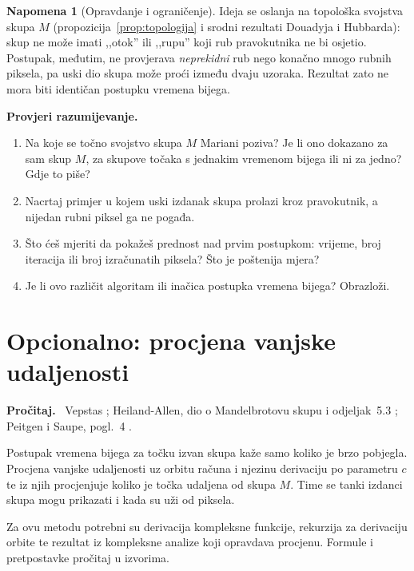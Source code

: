 \documentclass[11pt,a4paper]{article}
\theoremstyle{definition}
\newtheorem*{napomena}{Napomena}
\theoremstyle{plain}
\newenvironment{citaj}
  {\par\medskip\noindent\textbf{\color{blue!60!black}Pročitaj.}\ }
  {\par\medskip}
\newenvironment{pitanja}
  {\par\noindent\textbf{\color{orange!70!black}Provjeri razumijevanje.}
   \begin{enumerate}[label=\arabic*., nosep]}
  {\end{enumerate}\medskip}
\begin{document}
\begin{napomena}[Opravdanje i ograničenje]
Ideja se oslanja na topološka svojstva skupa $M$
(propozicija~\ref{prop:topologija} i srodni rezultati Douadyja i Hubbarda):
skup ne može imati ,,otok'' ili ,,rupu'' koji rub pravokutnika ne bi
osjetio. Postupak, međutim, ne provjerava \emph{neprekidni} rub nego konačno
mnogo rubnih piksela, pa uski dio skupa može proći između dvaju uzoraka.
Rezultat zato ne mora biti identičan postupku vremena bijega.
\end{napomena}

\begin{pitanja}
  \item Na koje se točno svojstvo skupa $M$ Mariani poziva? Je li ono dokazano
        za sam skup $M$, za skupove točaka s jednakim vremenom bijega ili ni
        za jedno? Gdje to piše?
  \item Nacrtaj primjer u kojem uski izdanak skupa prolazi kroz pravokutnik,
        a nijedan rubni piksel ga ne pogađa.
  \item Što ćeš mjeriti da pokažeš prednost nad prvim postupkom: vrijeme,
        broj iteracija ili broj izračunatih piksela? Što je poštenija mjera?
  \item Je li ovo različit algoritam ili inačica postupka vremena bijega?
        Obrazloži.
\end{pitanja}

\section{Opcionalno: procjena vanjske udaljenosti}
\label{sec:udaljenost}

\begin{citaj}
Vepstas \cite{vepstas_derivatives}; Heiland-Allen, dio o Mandelbrotovu skupu
i odjeljak~5.3 \cite{heilandallen_de}; Peitgen i Saupe, pogl.~4
\cite{peitgen_saupe1988}.
\end{citaj}

Postupak vremena bijega za točku izvan skupa kaže samo koliko je brzo
pobjegla. Procjena vanjske udaljenosti uz orbitu računa i njezinu derivaciju
po parametru $c$ te iz njih procjenjuje koliko je točka udaljena od skupa $M$.
Time se tanki izdanci skupa mogu prikazati i kada su uži od piksela.

Za ovu metodu potrebni su derivacija kompleksne funkcije, rekurzija za
derivaciju orbite te rezultat iz kompleksne analize koji opravdava procjenu.
Formule i pretpostavke pročitaj u izvorima.
\end{document}
